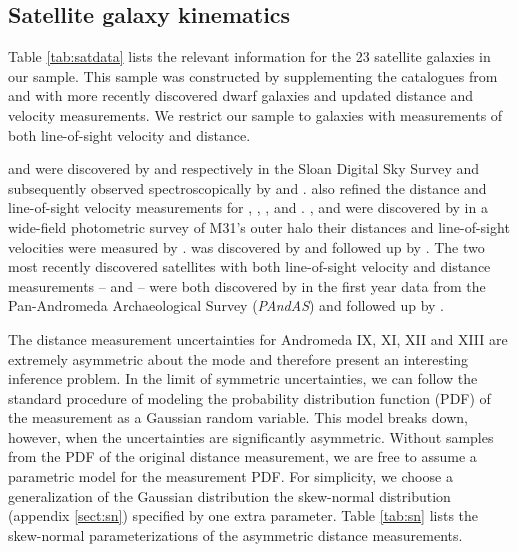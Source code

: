 \documentclass[preprint]{aastex}
\newcommand{\project}[1]{\emph{#1}}
\newcommand{\sdss}{\project{SDSS}}
\newcommand{\pandas}{\project{PAndAS}}
\begin{document}
\subsection{Satellite galaxy kinematics}

Table \ref{tab:satdata} lists the relevant information for the 23 satellite
galaxies in our sample.  This sample was constructed by supplementing the
catalogues from \citet{Evans:2000a} and \cite{McConnachie:2006} with more
recently discovered dwarf galaxies and updated distance and velocity measurements.
We restrict our sample to galaxies with measurements of both line-of-sight
velocity and distance.

 and  were discovered by
\citet{Zucker:2004} and \citet{Zucker:2007} respectively in the Sloan Digital
Sky Survey \citep[\sdss;][]{York:2000} and subsequently observed spectroscopically
by \citet{Collins:2010} and \citet{Kalirai:2010}.  \citet{Kalirai:2010} also
refined the distance and line-of-sight velocity measurements for
, , ,
 and .  ,
 and  were discovered by
\citet{Martin:2006} in a wide-field photometric survey of M31's outer halo
their distances and line-of-sight velocities were measured by
\citet{Collins:2010}.   was discovered by
\citet{Majewski:2007} and followed up by \citet{Kalirai:2010}.  The two most
recently discovered satellites with both line-of-sight velocity and distance
measurements --  and  -- were
both discovered by \citet{Ibata:2007} in the first year data from the
Pan-Andromeda Archaeological Survey (\pandas) and followed up by \citet{Letarte:2009}.

The distance measurement uncertainties for Andromeda IX, XI, XII and XIII are
extremely asymmetric about the mode and therefore present an interesting
inference problem.  In the limit of symmetric uncertainties, we can follow the
standard procedure of modeling the probability distribution function (PDF) of
the measurement as a Gaussian random variable.  This model breaks down, however,
when the uncertainties are significantly asymmetric.  Without samples from the PDF
of the original distance measurement, we are free to assume a parametric model
for the measurement PDF.  For simplicity, we choose a generalization of the
Gaussian distribution the skew-normal distribution (appendix \ref{sect:sn})
specified by one extra parameter.  Table \ref{tab:sn} lists the skew-normal
parameterizations of the asymmetric distance measurements.
\end{document}
